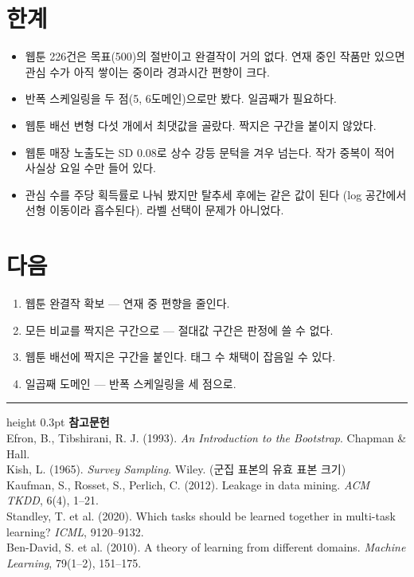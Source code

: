 \documentclass[10pt]{article}
\begin{document}
\section{한계}

\begin{itemize}[leftmargin=1.1em,itemsep=0.15em]
\item 웹툰 226건은 목표(500)의 절반이고 완결작이 거의 없다. 연재 중인 작품만
      있으면 관심 수가 아직 쌓이는 중이라 경과시간 편향이 크다.
\item 반폭 스케일링을 두 점(5, 6도메인)으로만 봤다. 일곱째가 필요하다.
\item 웹툰 배선 변형 다섯 개에서 최댓값을 골랐다. 짝지은 구간을 붙이지 않았다.
\item 웹툰 매장 노출도는 SD 0.08로 상수 강등 문턱을 겨우 넘는다. 작가 중복이
      적어 사실상 요일 수만 들어 있다.
\item 관심 수를 주당 획득률로 나눠 봤지만 탈추세 후에는 같은 값이 된다
      (log 공간에서 선형 이동이라 흡수된다). 라벨 선택이 문제가 아니었다.
\end{itemize}

\section{다음}

\begin{enumerate}[leftmargin=1.3em,itemsep=0.15em]
\item 웹툰 완결작 확보 --- 연재 중 편향을 줄인다.
\item 모든 비교를 짝지은 구간으로 --- 절대값 구간은 판정에 쓸 수 없다.
\item 웹툰 배선에 짝지은 구간을 붙인다. 태그 수 채택이 잡음일 수 있다.
\item 일곱째 도메인 --- 반폭 스케일링을 세 점으로.
\end{enumerate}

\vspace{0.6em}
\hrule height 0.3pt
\vspace{0.5em}
{\footnotesize
\textbf{참고문헌}\\[0.3em]
Efron, B., Tibshirani, R. J. (1993). \emph{An Introduction to the Bootstrap}.
Chapman \& Hall.\\[0.15em]
Kish, L. (1965). \emph{Survey Sampling}. Wiley. (군집 표본의 유효 표본 크기)\\[0.15em]
Kaufman, S., Rosset, S., Perlich, C. (2012). Leakage in data mining.
\emph{ACM TKDD}, 6(4), 1--21.\\[0.15em]
Standley, T. et al. (2020). Which tasks should be learned together in multi-task
learning? \emph{ICML}, 9120--9132.\\[0.15em]
Ben-David, S. et al. (2010). A theory of learning from different domains.
\emph{Machine Learning}, 79(1--2), 151--175.
}
\end{document}
